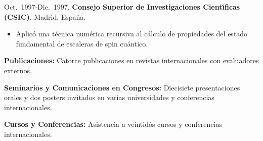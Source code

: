\documentclass{article}
\begin{document}
Oct.~1997-Dic.~1997. 
{\bf Consejo Superior de Investigaciones Cient\'{\i}ficas (CSIC)}. Madrid, Espa\~na. 

\begin{itemize}\itemsep 0pt
\item Aplic\'{o} una t\'{e}cnica num\'{e}rica recursiva al c\'{a}lculo 
de propiedades del estado fundamental de escaleras de spin cu\'{a}ntico.
\end{itemize}



\medskip
{\bf Publicaciones:}
%
Catorce publicaciones en revistas internacionales con evaluadores externos.


\medskip
{\bf Seminarios y Comunicaciones en Congresos:}
%
Diecisiete presentaciones orales y dos posters invitados en varias 
universidades y conferencias internacionales.


\medskip
{\bf Cursos y Conferencias:}
%
Asistencia a veintid\'os cursos y conferencias internacionales.

\end{document}

